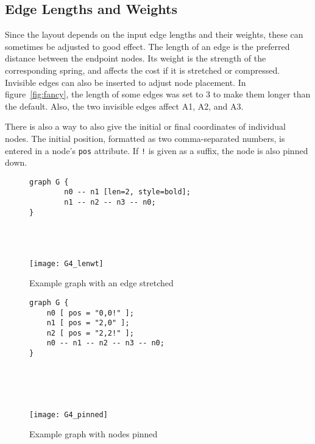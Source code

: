 \documentclass[11pt]{article}
\begin{document}
\subsection{Edge Lengths and Weights}
Since the layout depends on the input edge lengths and their weights,
these can sometimes be adjusted to good effect.
The length of an edge is the preferred distance between the endpoint nodes.
Its weight is the strength of the corresponding spring, and affects the cost
if it is stretched or compressed.  Invisible edges can also be inserted to
adjust node placement.  In figure~\ref{fig:fancy}, the length of some
edges was set to 3 to make them longer than the default.
Also, the two invisible edges affect A1, A2, and A3.

There is also a way to also give the initial or final coordinates of
individual nodes.  The initial position, formatted as two comma-separated
numbers, is entered in a node's \verb"pos" attribute.  If \verb"!" is given
as a suffix, the node is also pinned down.

\begin{figure}
\begin{minipage}[b]{2in}
\begin{verbatim}
graph G {
        n0 -- n1 [len=2, style=bold];
        n1 -- n2 -- n3 -- n0;
}

\end{verbatim}
\end{minipage} \hspace{1.0in} \
\parbox[b]{2.5in}{
	\ \\
    \texttt{[image: G4\_lenwt]}
}
\caption{Example graph with an edge stretched}
\label{fig:G4_lenwt}
\end{figure}

\begin{figure}
\begin{minipage}[b]{2in}
\begin{verbatim}
graph G {
    n0 [ pos = "0,0!" ];
    n1 [ pos = "2,0" ];
    n2 [ pos = "2,2!" ];
    n0 -- n1 -- n2 -- n3 -- n0;
}


\end{verbatim}
\end{minipage} \hspace{.5in} \
\parbox[b]{3in}{
	\ \\
    \texttt{[image: G4\_pinned]}
}
\caption{Example graph with nodes pinned}
\label{fig:G4_pinned}
\end{figure}
\end{document}
